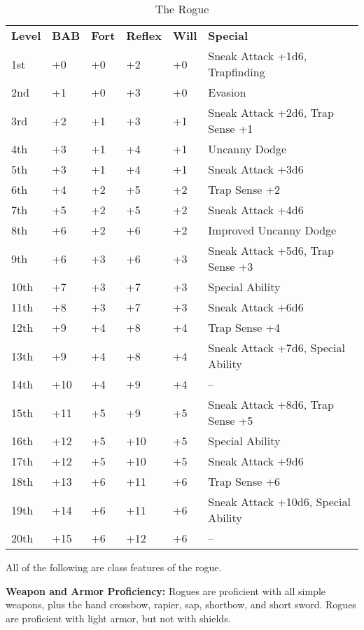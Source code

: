 \begin{table}[htb]
\caption{The Rogue}
\centering
\begin{tabular}{*{6}{l}}
\textbf{Level} & \textbf{BAB} & \textbf{Fort} & \textbf{Reflex} & \textbf{Will} & \textbf{Special} \\
1st & +0 & +0 & +2 & +0 & Sneak Attack +1d6, Trapfinding \\
2nd & +1 & +0 & +3 & +0 & Evasion \\
3rd & +2 & +1 & +3 & +1 & Sneak Attack +2d6, Trap Sense +1 \\
4th & +3 & +1 & +4 & +1 & Uncanny Dodge \\
5th & +3 & +1 & +4 & +1 & Sneak Attack +3d6 \\
6th & +4 & +2 & +5 & +2 & Trap Sense +2 \\
7th & +5 & +2 & +5 & +2 & Sneak Attack +4d6 \\
8th & +6 & +2 & +6 & +2 & Improved Uncanny Dodge \\
9th & +6 & +3 & +6 & +3 & Sneak Attack +5d6, Trap Sense +3 \\
10th & +7 & +3 & +7 & +3 & Special Ability \\
11th & +8 & +3 & +7 & +3 & Sneak Attack +6d6 \\
12th & +9 & +4 & +8 & +4 & Trap Sense +4 \\
13th & +9 & +4 & +8 & +4 & Sneak Attack +7d6, Special Ability \\
14th & +10 & +4 & +9 & +4 & -- \\
15th & +11 & +5 & +9 & +5 & Sneak Attack +8d6, Trap Sense +5 \\
16th & +12 & +5 & +10 & +5 & Special Ability \\
17th & +12 & +5 & +10 & +5 & Sneak Attack +9d6 \\
18th & +13 & +6 & +11 & +6 & Trap Sense +6 \\
19th & +14 & +6 & +11 & +6 & Sneak Attack +10d6, Special Ability \\
20th & +15 & +6 & +12 & +6 & -- \\
\end{tabular}
\end{table}

\ClassFeatures

All of the following are class features of the rogue.

\textbf{Weapon and Armor Proficiency:} Rogues are proficient with all simple weapons, 
plus the hand crossbow, rapier, sap, shortbow, and short sword. Rogues are proficient 
with light armor, but not with shields.


